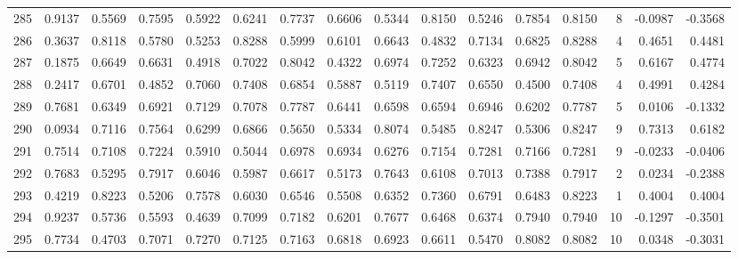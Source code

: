 \begin{tabular}{lrrrrrrrrrrrrrrr}
285 &      0.9137 &  0.5569 &  0.7595 &  0.5922 &  0.6241 &  0.7737 &  0.6606 &  0.5344 &  0.8150 &  0.5246 &   0.7854 &     0.8150 &      8 &                   -0.0987 &                    -0.3568 \\
286 &      0.3637 &  0.8118 &  0.5780 &  0.5253 &  0.8288 &  0.5999 &  0.6101 &  0.6643 &  0.4832 &  0.7134 &   0.6825 &     0.8288 &      4 &                    0.4651 &                     0.4481 \\
287 &      0.1875 &  0.6649 &  0.6631 &  0.4918 &  0.7022 &  0.8042 &  0.4322 &  0.6974 &  0.7252 &  0.6323 &   0.6942 &     0.8042 &      5 &                    0.6167 &                     0.4774 \\
288 &      0.2417 &  0.6701 &  0.4852 &  0.7060 &  0.7408 &  0.6854 &  0.5887 &  0.5119 &  0.7407 &  0.6550 &   0.4500 &     0.7408 &      4 &                    0.4991 &                     0.4284 \\
289 &      0.7681 &  0.6349 &  0.6921 &  0.7129 &  0.7078 &  0.7787 &  0.6441 &  0.6598 &  0.6594 &  0.6946 &   0.6202 &     0.7787 &      5 &                    0.0106 &                    -0.1332 \\
290 &      0.0934 &  0.7116 &  0.7564 &  0.6299 &  0.6866 &  0.5650 &  0.5334 &  0.8074 &  0.5485 &  0.8247 &   0.5306 &     0.8247 &      9 &                    0.7313 &                     0.6182 \\
291 &      0.7514 &  0.7108 &  0.7224 &  0.5910 &  0.5044 &  0.6978 &  0.6934 &  0.6276 &  0.7154 &  0.7281 &   0.7166 &     0.7281 &      9 &                   -0.0233 &                    -0.0406 \\
292 &      0.7683 &  0.5295 &  0.7917 &  0.6046 &  0.5987 &  0.6617 &  0.5173 &  0.7643 &  0.6108 &  0.7013 &   0.7388 &     0.7917 &      2 &                    0.0234 &                    -0.2388 \\
293 &      0.4219 &  0.8223 &  0.5206 &  0.7578 &  0.6030 &  0.6546 &  0.5508 &  0.6352 &  0.7360 &  0.6791 &   0.6483 &     0.8223 &      1 &                    0.4004 &                     0.4004 \\
294 &      0.9237 &  0.5736 &  0.5593 &  0.4639 &  0.7099 &  0.7182 &  0.6201 &  0.7677 &  0.6468 &  0.6374 &   0.7940 &     0.7940 &     10 &                   -0.1297 &                    -0.3501 \\
295 &      0.7734 &  0.4703 &  0.7071 &  0.7270 &  0.7125 &  0.7163 &  0.6818 &  0.6923 &  0.6611 &  0.5470 &   0.8082 &     0.8082 &     10 &                    0.0348 &                    -0.3031 \\

\end{tabular}
